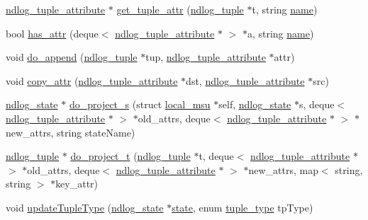 \begin{DoxyCompactItemize}
\item 
\hyperlink{structndlog__tuple__attribute}{ndlog\-\_\-tuple\-\_\-attribute} $\ast$ \hyperlink{helper-function_8cc_a4d7e8bda6fe9e0195da6c80951077f42}{get\-\_\-tuple\-\_\-attr} (\hyperlink{structndlog__tuple}{ndlog\-\_\-tuple} $\ast$t, string \hyperlink{http__parser_8c_a8f8f80d37794cde9472343e4487ba3eb}{name})
\item 
bool \hyperlink{helper-function_8cc_a7ba40978a7c6904ea85168981299da89}{has\-\_\-attr} (deque$<$ \hyperlink{structndlog__tuple__attribute}{ndlog\-\_\-tuple\-\_\-attribute} $\ast$ $>$ $\ast$a, string \hyperlink{http__parser_8c_a8f8f80d37794cde9472343e4487ba3eb}{name})
\item 
void \hyperlink{helper-function_8cc_afdd669347d9fea1e3d9f3e1cdd1ede08}{do\-\_\-append} (\hyperlink{structndlog__tuple}{ndlog\-\_\-tuple} $\ast$tup, \hyperlink{structndlog__tuple__attribute}{ndlog\-\_\-tuple\-\_\-attribute} $\ast$attr)
\item 
void \hyperlink{helper-function_8cc_a5da3f4446e98fbe68949cf2521996730}{copy\-\_\-attr} (\hyperlink{structndlog__tuple__attribute}{ndlog\-\_\-tuple\-\_\-attribute} $\ast$dst, \hyperlink{structndlog__tuple__attribute}{ndlog\-\_\-tuple\-\_\-attribute} $\ast$src)
\item 
\hyperlink{structndlog__state}{ndlog\-\_\-state} $\ast$ \hyperlink{helper-function_8cc_a20885005d76692c36c0af920a9ca58c0}{do\-\_\-project\-\_\-s} (struct \hyperlink{structlocal__msu}{local\-\_\-msu} $\ast$self, \hyperlink{structndlog__state}{ndlog\-\_\-state} $\ast$s, deque$<$ \hyperlink{structndlog__tuple__attribute}{ndlog\-\_\-tuple\-\_\-attribute} $\ast$ $>$ $\ast$old\-\_\-attrs, deque$<$ \hyperlink{structndlog__tuple__attribute}{ndlog\-\_\-tuple\-\_\-attribute} $\ast$ $>$ $\ast$new\-\_\-attrs, string state\-Name)
\item 
\hyperlink{structndlog__tuple}{ndlog\-\_\-tuple} $\ast$ \hyperlink{helper-function_8cc_afffd163f6938cde2285249a95e7a1e38}{do\-\_\-project\-\_\-t} (\hyperlink{structndlog__tuple}{ndlog\-\_\-tuple} $\ast$t, deque$<$ \hyperlink{structndlog__tuple__attribute}{ndlog\-\_\-tuple\-\_\-attribute} $\ast$ $>$ $\ast$old\-\_\-attrs, deque$<$ \hyperlink{structndlog__tuple__attribute}{ndlog\-\_\-tuple\-\_\-attribute} $\ast$ $>$ $\ast$new\-\_\-attrs, map$<$ string, string $>$ $\ast$key\-\_\-attr)
\item 
void \hyperlink{helper-function_8cc_a67e3619fb8bab96644f4a6d3edf8b95e}{update\-Tuple\-Type} (\hyperlink{structndlog__state}{ndlog\-\_\-state} $\ast$\hyperlink{http__parser_8c_adc6e5733fc3c22f0a7b2914188c49c90}{state}, enum \hyperlink{model_8h_ae688e205096dad09ca010b144f151f40}{tuple\-\_\-type} tp\-Type)

\end{DoxyCompactItemize}
